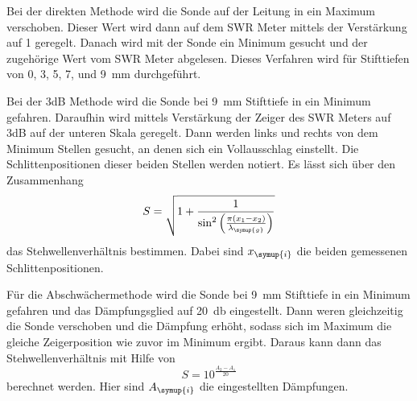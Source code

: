 Bei der
direkten Methode wird die Sonde auf der Leitung in ein Maximum verschoben. Dieser
Wert wird dann auf dem SWR Meter mittels der Verstärkung auf 1 geregelt. Danach
wird mit der Sonde ein Minimum gesucht und der zugehörige Wert vom SWR Meter
abgelesen. Dieses Verfahren wird für Stifttiefen von 0, 3, 5, 7, und \SI{9}{\milli\meter}
durchgeführt.

Bei der 3dB Methode wird die Sonde bei \SI{9}{\milli\meter} Stifttiefe in ein
Minimum gefahren. Daraufhin wird mittels Verstärkung der Zeiger des SWR Meters auf
3dB auf der unteren Skala geregelt. Dann werden links und rechts von dem Minimum
Stellen gesucht, an denen sich ein Vollausschlag einstellt. Die Schlittenpositionen
dieser beiden Stellen werden notiert. Es lässt sich über den Zusammenhang
\begin{equation}
  S=\sqrt{1+\frac{1}{\sin^2\left(\frac{\pi(x_1-x_2)}{\lambda_{\symup{g}}}\right)}}
  \label{3dB}
\end{equation}
das Stehwellenverhältnis bestimmen. Dabei sind $x_{\symup{i}}$ die beiden gemessenen
Schlittenpositionen.

Für die Abschwächermethode wird die Sonde bei \SI{9}{\milli\meter} Stifttiefe in ein
Minimum gefahren und das Dämpfungsglied auf \SI{20}{\decibel} eingestellt. Dann
weren gleichzeitig die Sonde verschoben und die Dämpfung erhöht, sodass sich im
Maximum die gleiche Zeigerposition wie zuvor im Minimum ergibt. Daraus kann dann
das Stehwellenverhältnis mit Hilfe von
\begin{equation}
  S=10^{\frac{A_2-A_1}{20}}
  \label{abschwaecher}
\end{equation}
berechnet werden. Hier sind $A_{\symup{i}}$ die eingestellten Dämpfungen.
